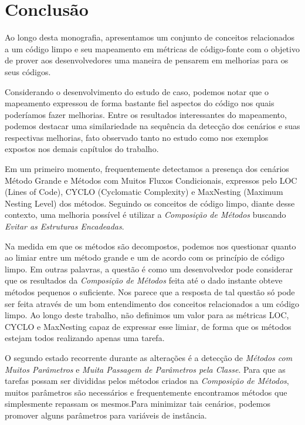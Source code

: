 \chapter{Conclusão}
\label{chap:conclusao}

Ao longo desta monografia, apresentamos um conjunto de conceitos relacionados a um código limpo e
seu mapeamento em métricas de código-fonte com o objetivo de prover aos desenvolvedores uma maneira
de pensarem em melhorias para os seus códigos.

Considerando o desenvolvimento do estudo de caso, podemos notar que o mapeamento expressou de forma
bastante fiel aspectos do código nos quais poderíamos fazer melhorias.  Entre os resultados interessantes
do mapeamento, podemos destacar uma similariedade na sequência da detecção dos cenários e suas respectivas
melhorias, fato observado tanto no estudo como nos exemplos expostos nos demais capítulos do trabalho.

Em um primeiro momento, frequentemente detectamos a presença dos cenários Método Grande e Métodos com Muitos 
Fluxos Condicionais, expressos pelo LOC (Lines of Code), CYCLO (Cyclomatic Complexity) e
MaxNesting (Maximum Nesting Level) dos métodos. Seguindo os conceitos de código limpo,
diante desse contexto, uma melhoria possível é utilizar a \textit{Composição de Métodos} buscando
\textit{Evitar as Estruturas Encadeadas}.

Na medida em que os métodos são decompostos, podemos nos questionar quanto ao limiar entre um método grande e 
um de acordo com os princípio de código limpo.
Em outras palavras, a questão é como um desenvolvedor pode considerar que os resultados da
\textit{Composição de Métodos} feita até o dado instante obteve métodos pequenos o suficiente. Nos parece que a 
resposta de tal questão só pode ser feita através de um bom entendimento dos conceitos relacionados a um código 
limpo. Ao longo deste trabalho, não definimos um valor para as métricas LOC, CYCLO e MaxNesting capaz de expressar 
esse limiar, de forma que os métodos estejam todos realizando apenas uma tarefa.

O segundo estado recorrente durante as alterações é a detecção de \textit{Métodos com Muitos Parâmetros} e
\textit{Muita Passagem de Parâmetros pela Classe}. Para que as tarefas possam ser divididas pelos métodos 
criados na \textit{Composição de Métodos}, muitos parâmetros são necessários e frequentemente encontramos
métodos que simplesmente repassam os mesmos.Para minimizar tais cenários, podemos promover alguns parâmetros para 
variáveis de instância.

